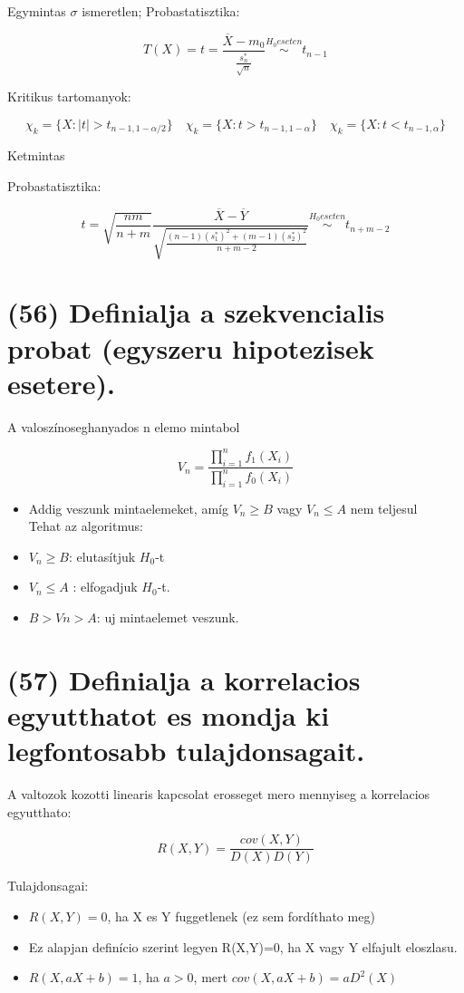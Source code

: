 \documentclass[12p]{article}
\begin{document}
Egymintas
$\sigma$ ismeretlen; Probastatisztika:

$$T(X) = t = \frac{\overline{X} - m_0}{\frac{s^{*}_n}{\sqrt{n}}} \stackrel{H_0 eseten}{\sim} t_{n-1}$$

Kritikus tartomanyok:

$$\chi_k = \{X: |t| > t_{n-1,1-\alpha/2}\} \quad \chi_k = \{X: t > t_{n-1,1-\alpha}\} \quad \chi_k = \{X: t < t_{n-1, \alpha}\}$$

Ketmintas

Probastatisztika:

$$\displaystyle{t = \sqrt{\frac{nm}{n+m}}\frac{\overline{X} - \overline{Y}}{\sqrt{\frac{(n-1)(s^*_1)^2 + (m-1)(s^*_2)^2}{n+m-2}}} \stackrel{H_0 eseten}{\sim}
t_{n+m-2}}$$

\section{(56) Definialja a szekvencialis probat (egyszeru hipotezisek esetere).}

A valoszínoseghanyados n elemo mintabol

$$\displaystyle{V_n = \frac{\prod^n_{i=1} f_1(X_i)}{\prod^n_{i=1} f_0(X_i)}}$$

\begin{itemize}
\item Addig veszunk mintaelemeket, amíg $V_n \geq B$ vagy $V_n \leq A$ nem teljesul\\
Tehat az algoritmus:
\item $V_n \geq B$: elutasítjuk $H_0$-t
\item $V_n \leq A$ : elfogadjuk $H_0$-t.
\item $B>Vn>A$: uj mintaelemet veszunk.
\end{itemize}

\section{(57) Definialja a korrelacios egyutthatot es mondja ki legfontosabb tulajdonsagait.}

A valtozok kozotti linearis kapcsolat erosseget mero
mennyiseg a korrelacios egyutthato: 

$$R(X, Y) = \frac{cov(X,Y)}{D(X)D(Y)}$$

Tulajdonsagai:

\begin{itemize}
\item $R(X,Y)=0$, ha X es Y fuggetlenek (ez sem
fordíthato meg)
\item Ez alapjan definício szerint legyen R(X,Y)=0, ha X
vagy Y elfajult eloszlasu.
\item $R(X,aX+b)=1$, ha $a>0$, mert $cov(X,aX+b)=aD^2(X)$
\end{itemize}
\end{document}
